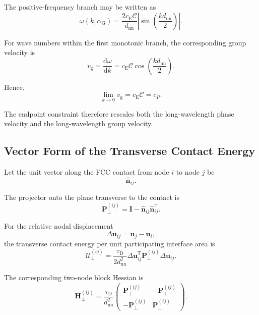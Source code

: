 The positive-frequency branch may be written as
\begin{equation}
    \omega(k,\alpha_{\mathrm{G}}) = \frac{2c_{\mathrm{E}}\mathcal{C}}{d_{\mathrm{nn}}} \left| \sin \left( \frac{kd_{\mathrm{nn}}}{2} \right) \right|.
\end{equation}

For wave numbers within the first monotonic branch, the corresponding group velocity is
\begin{equation}
    v_{\mathrm{g}} = \frac{\mathrm{d}\omega}{\mathrm{d}k} = c_{\mathrm{E}}\mathcal{C} \cos \left( \frac{kd_{\mathrm{nn}}}{2} \right).
\end{equation}

Hence,
\begin{equation}
    \lim_{k\rightarrow 0}v_{\mathrm{g}} = c_{\mathrm{E}}\mathcal{C} = c_P.
\end{equation}

The endpoint constraint therefore rescales both the long-wavelength phase velocity and the long-wavelength group velocity.

\subsection{Vector Form of the Transverse Contact Energy}

Let the unit vector along the FCC contact from node $i$ to node $j$ be
\begin{equation}
    \hat{\mathbf{n}}_{ij}.
\end{equation}

The projector onto the plane transverse to the contact is
\begin{equation}
    \mathbf{P}_{\perp}^{(ij)} = \mathbf{I} - \hat{\mathbf{n}}_{ij} \hat{\mathbf{n}}_{ij}^{\mathsf{T}}.
\end{equation}

For the relative nodal displacement
\begin{equation}
    \Delta\mathbf{u}_{ij} = \mathbf{u}_j - \mathbf{u}_i,
\end{equation}
the transverse contact energy per unit participating interface area is
\begin{equation}
    \boxed{ \mathcal{U}_{\perp}^{(ij)} = \frac{\tau_{\mathrm{D}}}{2d_{\mathrm{nn}}^2} \Delta\mathbf{u}_{ij}^{\mathsf{T}} \mathbf{P}_{\perp}^{(ij)} \Delta\mathbf{u}_{ij} }.
\end{equation}

The corresponding two-node block Hessian is
\begin{equation}
    \boxed{ \mathbf{H}_{\perp}^{(ij)} = \frac{\tau_{\mathrm{D}}}{d_{\mathrm{nn}}^2}
    \begin{pmatrix}
        \mathbf{P}_{\perp}^{(ij)} & -\mathbf{P}_{\perp}^{(ij)} \\[3pt]
        -\mathbf{P}_{\perp}^{(ij)} & \mathbf{P}_{\perp}^{(ij)}
    \end{pmatrix} }.
\end{equation}

